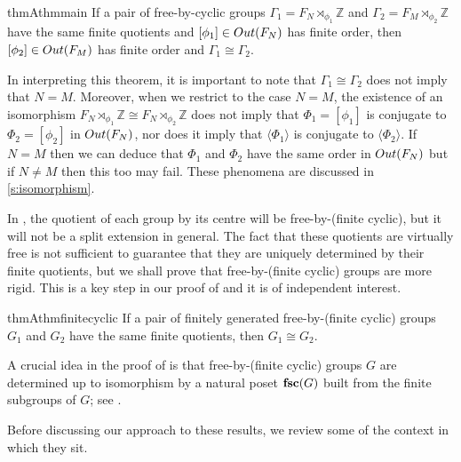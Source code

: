 \documentclass[11pt, a4 paper]{amsart}
\numberwithin{equation}{section}
\theoremstyle{remark}
\theoremstyle{definition}
\def\Z{\mathbb Z}
\def\G{\Gamma}
\def\tsc{{\rm{\bf{fsc}}}}
\def\G{\Gamma}
\def\<{\langle}
\def\>{\rangle}
\begin{document}
\begin{restatable}{thmA}{thmmain}
\label{t:main}
	If a pair of free-by-cyclic groups 
	$\Gamma_1=F_{N}\rtimes_{\phi_1}\Z$ and $\Gamma_2=F_{M}\rtimes_{\phi_2}\Z$ 
	have the same finite quotients 
	and $[\phi_1]\in{\rm{Out}}(F_N)$ has finite order, 
	then $[\phi_2]\in{\rm{Out}}(F_M)$ has finite order 
	and $\Gamma_1\cong\Gamma_2$.
\end{restatable}


In interpreting this theorem, it is important to note that 
$\G_1\cong\G_2$ does not imply that $N=M$.
Moreover, when we restrict to the case $N=M$, 
the existence of an isomorphism 
$F_{N}\rtimes_{\phi_1}\Z\cong F_{N}\rtimes_{\phi_2}\Z$ 
does not imply that 
$\Phi_1 = [\phi_1]$ is conjugate to $\Phi_2 = [\phi_2]$ 
in ${\rm{Out}}(F_N)$, 
nor does it imply that 
$\<\Phi_1\>$ is conjugate to $\<\Phi_2\>$. 
If $N=M$ then we can deduce that 
$\Phi_1$ and $\Phi_2$ have the same order in ${\rm{Out}}(F_N)$ 
but if $N\neq M$ then this too may fail. 
These phenomena are discussed in \cref{s:isomorphism}.

In , %
the quotient of each group by its centre 
will be free-by-(finite cyclic), 
but it will not be a split extension in general. 
The fact that these quotients are virtually free 
is not sufficient to guarantee that 
they are uniquely determined by their finite quotients, 
but we shall prove that 
free-by-(finite cyclic) groups are more rigid. 
This is a key step in our proof of  
and it is of independent interest. 

\begin{restatable}{thmA}{thmfinitecyclic}
\label{thm:free-by-finite-cyclic}
	If a pair of finitely generated free-by-(finite cyclic) groups $G_1$ and $G_2$
	have the same finite quotients, then $G_1\cong G_2$. 
\end{restatable}

A crucial idea in the proof of  
is that free-by-(finite cyclic) groups $G$ 
are determined up to isomorphism by a natural poset $\tsc(G)$ 
built from the finite subgroups of $G$; 
see . 

Before discussing our approach to these results, 
we review some of the context in which they sit. 
\end{document}
